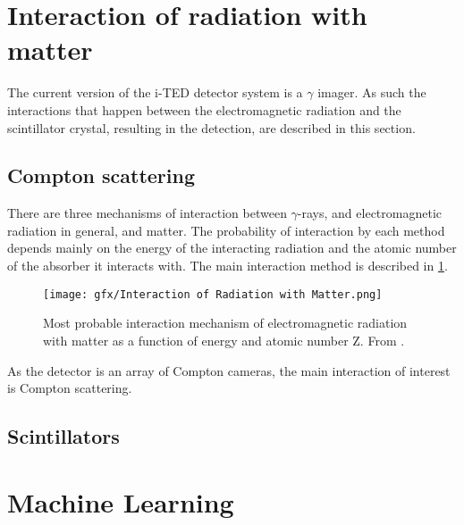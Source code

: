 \section{Interaction of radiation with matter}\label{sec:interaction}

The current version of the \ac{i-TED} detector system is a $\gamma$ imager. As such the interactions that happen between the electromagnetic radiation and the scintillator crystal, resulting in the detection, are described in this section.

\subsection{Compton scattering}

There are three mechanisms of interaction between $\gamma$-rays, and electromagnetic radiation in general, and matter. The probability of interaction by each method depends mainly on the energy of the interacting radiation and the atomic number of the absorber it interacts with. The main interaction method is described in \ref{fig:interaction_mechanism}.

\begin{figure}[h!]
    \centering
    \texttt{[image: gfx/Interaction of Radiation with Matter.png]}%
    \caption{Most probable interaction mechanism of electromagnetic radiation with matter as a function of energy and atomic number Z. From \cite{ParticlePhysicsReference2}.}%
    \label{fig:interaction_mechanism}%
\end{figure}

As the detector is an array of Compton cameras, the main interaction of interest is Compton scattering.

\subsection{Scintillators}

\section{Machine Learning}\label{sec:ml}


